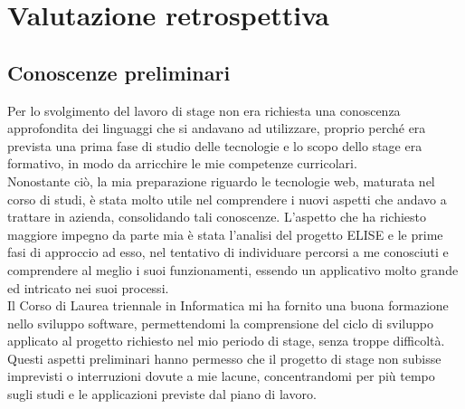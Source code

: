 
\chapter{Valutazione retrospettiva}
\label{cap:valutazione-retrospettiva}


\section{Conoscenze preliminari}

Per lo svolgimento del lavoro di stage non era richiesta una conoscenza approfondita dei linguaggi che si andavano ad utilizzare, proprio perché era prevista una prima fase di studio delle tecnologie e lo scopo dello stage era formativo, in modo da arricchire le mie competenze curricolari.\\

Nonostante ciò, la mia preparazione riguardo le tecnologie web,	maturata nel corso di studi, è stata molto utile nel comprendere i nuovi aspetti che andavo a trattare in azienda, consolidando tali conoscenze. L'aspetto che ha richiesto maggiore impegno da parte mia è stata l'analisi del progetto ELISE e le prime fasi di approccio ad esso, nel tentativo di individuare percorsi a me conosciuti e comprendere al meglio i suoi funzionamenti, essendo un applicativo molto grande ed intricato nei suoi processi.\\

Il Corso di Laurea triennale in Informatica mi ha fornito una buona formazione nello sviluppo software, permettendomi la comprensione del ciclo di sviluppo applicato al progetto richiesto nel mio periodo di stage, senza troppe difficoltà.\\
	
Questi aspetti preliminari hanno permesso che il progetto di stage non subisse imprevisti o interruzioni dovute a mie lacune, concentrandomi per più tempo sugli studi e le applicazioni previste dal piano di lavoro.

\newpage
